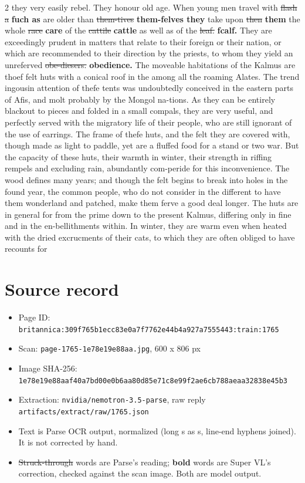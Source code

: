 \documentclass[10pt]{article}
\begin{document}
\begin{multicols}{2}
they very easily rebel. They honour old age. When young men travel with \sout{flash a} \textbf{fuch as} are older than \sout{them-tives} \textbf{them-felves they} take upon \sout{then} \textbf{them} the whole \sout{race} \textbf{care} of the \sout{cattile} \textbf{cattle} as well as of the \sout{leaf.} \textbf{fcalf.} They are exceedingly prudent in matters that relate to their foreign or their nation, or which are recommended to their direction by the priests, to whom they yield an unreferved \sout{obe-diesers.} \textbf{obedience.} The moveable habitations of the Kalmus are thoef felt huts with a conical roof in the among all the roaming Alates. The trend ingousin attention of thefe tents was undoubtedly conceived in the eastern parts of Afis, and molt probably by the Mongol na-tions. As they can be entirely blackout to pieces and folded in a small compals, they are very useful, and perfectly served with the migratory life of their people, who are still ignorant of the use of earrings. The frame of thefe huts, and the felt they are covered with, though made as light to paddle, yet are a fluffed food for a stand or two war. But the capacity of these huts, their warmth in winter, their strength in riffing rempels and excluding rain, abundantly com-peride for this inconvenience. The wood defines many years; and though the felt begins to break into holes in the found year, the common people, who do not consider in the different to have them wonderland and patched, make them ferve a good deal longer. The huts are in general for from the prime down to the present Kalmus, differing only in fine and in the en-bellithments within. In winter, they are warm even when heated with the dried excrucments of their cats, to which they are often obliged to have recounts for
\end{multicols}
\section*{Source record}
\begin{itemize}
\item Page ID: \texttt{britannica:309f765b1ecc83e0a7f7762e44b4a927a7555443:train:1765}
\item Scan: \texttt{page-1765-1e78e19e88aa.jpg}, 600 x 806 px
\item Image SHA-256: \texttt{\small 1e78e19e88aaf40a7bd00e0b6aa80d85e71c8e99f2ae6cb788aeaa32838e45b3}
\item Extraction: \texttt{nvidia/nemotron-3.5-parse}, raw reply \texttt{artifacts/extract/raw/1765.json}
\item Text is Parse OCR output, normalized (long s as s, line-end hyphens joined). It is not corrected by hand.
\item \sout{Struck-through} words are Parse's reading; \textbf{bold} words are Super VL's correction, checked against the scan image. Both are model output.
\end{itemize}
\end{document}
